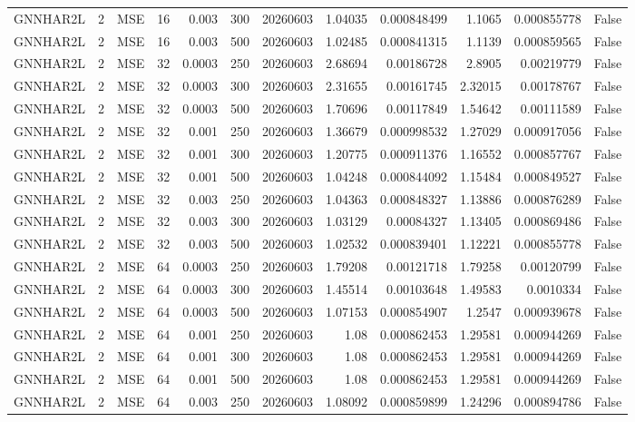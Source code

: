 \begin{tabular}{lrlrrrrrrrrr}
GNNHAR2L & 2 & MSE & 16 & 0.003 & 300 & 20260603 & 1.04035 & 0.000848499 & 1.1065 & 0.000855778 & False \\
GNNHAR2L & 2 & MSE & 16 & 0.003 & 500 & 20260603 & 1.02485 & 0.000841315 & 1.1139 & 0.000859565 & False \\
GNNHAR2L & 2 & MSE & 32 & 0.0003 & 250 & 20260603 & 2.68694 & 0.00186728 & 2.8905 & 0.00219779 & False \\
GNNHAR2L & 2 & MSE & 32 & 0.0003 & 300 & 20260603 & 2.31655 & 0.00161745 & 2.32015 & 0.00178767 & False \\
GNNHAR2L & 2 & MSE & 32 & 0.0003 & 500 & 20260603 & 1.70696 & 0.00117849 & 1.54642 & 0.00111589 & False \\
GNNHAR2L & 2 & MSE & 32 & 0.001 & 250 & 20260603 & 1.36679 & 0.000998532 & 1.27029 & 0.000917056 & False \\
GNNHAR2L & 2 & MSE & 32 & 0.001 & 300 & 20260603 & 1.20775 & 0.000911376 & 1.16552 & 0.000857767 & False \\
GNNHAR2L & 2 & MSE & 32 & 0.001 & 500 & 20260603 & 1.04248 & 0.000844092 & 1.15484 & 0.000849527 & False \\
GNNHAR2L & 2 & MSE & 32 & 0.003 & 250 & 20260603 & 1.04363 & 0.000848327 & 1.13886 & 0.000876289 & False \\
GNNHAR2L & 2 & MSE & 32 & 0.003 & 300 & 20260603 & 1.03129 & 0.00084327 & 1.13405 & 0.000869486 & False \\
GNNHAR2L & 2 & MSE & 32 & 0.003 & 500 & 20260603 & 1.02532 & 0.000839401 & 1.12221 & 0.000855778 & False \\
GNNHAR2L & 2 & MSE & 64 & 0.0003 & 250 & 20260603 & 1.79208 & 0.00121718 & 1.79258 & 0.00120799 & False \\
GNNHAR2L & 2 & MSE & 64 & 0.0003 & 300 & 20260603 & 1.45514 & 0.00103648 & 1.49583 & 0.0010334 & False \\
GNNHAR2L & 2 & MSE & 64 & 0.0003 & 500 & 20260603 & 1.07153 & 0.000854907 & 1.2547 & 0.000939678 & False \\
GNNHAR2L & 2 & MSE & 64 & 0.001 & 250 & 20260603 & 1.08 & 0.000862453 & 1.29581 & 0.000944269 & False \\
GNNHAR2L & 2 & MSE & 64 & 0.001 & 300 & 20260603 & 1.08 & 0.000862453 & 1.29581 & 0.000944269 & False \\
GNNHAR2L & 2 & MSE & 64 & 0.001 & 500 & 20260603 & 1.08 & 0.000862453 & 1.29581 & 0.000944269 & False \\
GNNHAR2L & 2 & MSE & 64 & 0.003 & 250 & 20260603 & 1.08092 & 0.000859899 & 1.24296 & 0.000894786 & False \\

\end{tabular}
